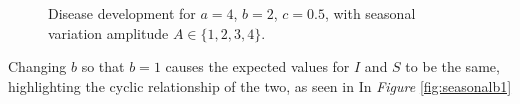 \begin{figure}[H]
    \caption{Disease development for $a=4$, $b=2$, $c=0.5$, with seasonal variation amplitude $A \in \{1,2,3,4\}$.}
    \label{fig:seasonalb2}
\end{figure}

Changing $b$ so that $b=1$ causes the expected values for $I$ and $S$ to be the same, highlighting the cyclic relationship of the two, as seen in In \textit{Figure} \ref{fig:seasonalb1}

